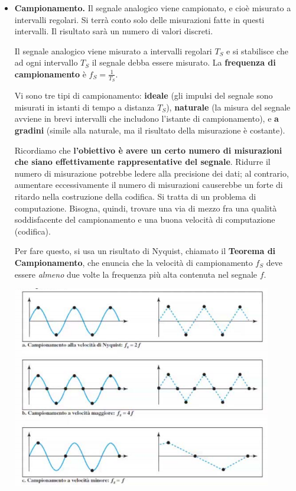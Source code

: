             \begin{itemize}
                \item 
                    \textbf{Campionamento.} Il segnale analogico viene campionato, e cioè misurato a intervalli regolari. Si terrà conto solo delle misurazioni fatte in questi intervalli. Il risultato sarà un numero di valori discreti.
                   
                    Il segnale analogico viene misurato a intervalli regolari $T_S$ e si stabilisce che ad ogni intervallo $T_S$ il segnale debba essere misurato. La \textbf{frequenza di campionamento} è \(f_S = \frac{1}{T_S}\).
                   
                    Vi sono tre tipi di campionamento: \textbf{ideale} (gli impulsi del segnale sono misurati in istanti di tempo a distanza $T_S$), \textbf{naturale} (la misura del segnale avviene in brevi intervalli che includono l'istante di campionamento), e \textbf{a gradini} (simile alla naturale, ma il risultato della misurazione è costante).
                    
                    \vspace{3mm}
                    
                    Ricordiamo che \textbf{l'obiettivo è avere un certo numero di misurazioni che siano effettivamente rappresentative del segnale}. Ridurre il numero di misurazione potrebbe ledere alla precisione dei dati; al contrario, aumentare eccessivamente il numero di misurazioni causerebbe un forte di ritardo nella costruzione della codifica. Si tratta di un problema di computazione. Bisogna, quindi, trovare una via di mezzo fra una qualità soddisfacente del campionamento e una buona velocità di computazione (codifica). 
                   
                    Per fare questo, si usa un risultato di Nyquist, chiamato il \textbf{Teorema di Campionamento}, che enuncia che la velocità di campionamento $f_S$ deve essere \textit{almeno} due volte la frequenza più alta contenuta nel segnale $f$.
                   
                    \begin{center}
                        \includegraphics[scale=0.75]{images/Campionamento.png}
                    \end{center}
                

\end{itemize}
